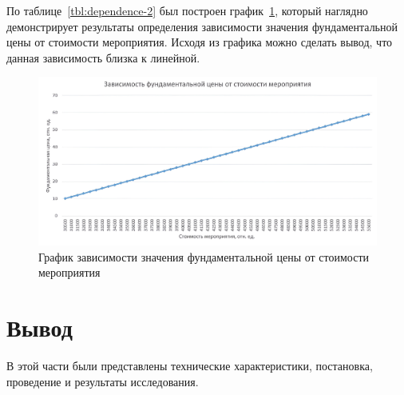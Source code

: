 По таблице~\ref{tbl:dependence-2} был построен график~\ref{fig:dependency-2}, который наглядно демонстрирует результаты определения зависимости значения фундаментальной цены от стоимости мероприятия. Исходя из графика можно сделать вывод, что данная зависимость близка к линейной.

\begin{figure}[H]
	\centering
	\includegraphics[width=1\textwidth]{images/dependency-2.png}
	\caption{График зависимости значения фундаментальной цены от стоимости мероприятия} 
	\label{fig:dependency-2} 
\end{figure}

\section{Вывод}

В этой части были представлены технические характеристики, постановка, проведение и результаты исследования.

\clearpage
